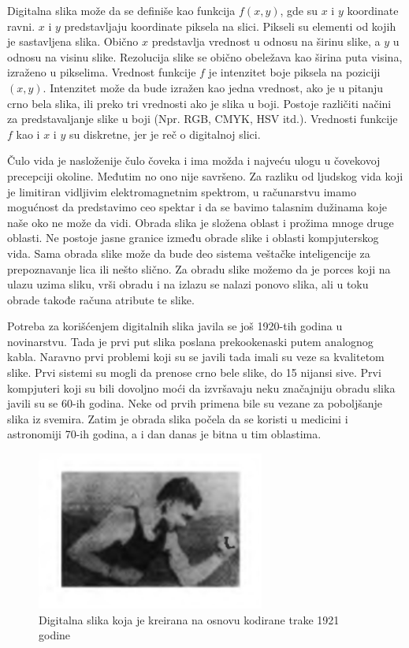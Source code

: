 \documentclass[a4paper,12pt,titlepage]{article}
\begin{document}
Digitalna slika može da se definiše kao funkcija $f(x, y)$, gde su $x$ i $y$ koordinate ravni. $x$ i $y$ predstavljaju koordinate piksela na slici. Pikseli su elementi od kojih je sastavljena slika. Obično $x$ predstavlja vrednost u odnosu na širinu slike, a $y$ u odnosu na visinu slike. Rezolucija slike se obično obeležava kao širina puta visina, izraženo u pikselima. Vrednost funkcije $f$ je intenzitet boje piksela na poziciji $(x, y)$. Intenzitet može da bude izražen kao jedna vrednost, ako je u pitanju crno bela slika, ili preko tri vrednosti ako je slika u boji. Postoje različiti načini za predstavaljanje slike u boji (Npr. RGB, CMYK, HSV itd.). Vrednosti funkcije $f$ kao i $x$ i $y$ su diskretne, jer je reč o digitalnoj slici. 

Čulo vida je nasloženije čulo čoveka i ima možda i najveću ulogu u čovekovoj precepciji okoline. Međutim no ono nije savršeno. Za razliku od ljudskog vida koji je limitiran vidljivim elektromagnetnim spektrom, u računarstvu imamo mogućnost da predstavimo ceo spektar i da se bavimo talasnim dužinama koje naše oko ne može da vidi. Obrada slika je složena oblast i prožima mnoge druge oblasti. Ne postoje jasne granice između obrade slike i oblasti kompjuterskog vida. Sama obrada slike može da bude deo sistema veštačke inteligencije za prepoznavanje lica ili nešto slično. Za obradu slike možemo da je porces koji na ulazu uzima sliku,   
vrši obradu i na izlazu se nalazi ponovo slika, ali u toku obrade takođe računa atribute te slike. 

Potreba za korišćenjem digitalnih slika javila se još 1920-tih godina u novinarstvu. Tada je prvi put slika poslana prekookenaski putem analognog kabla. Naravno prvi problemi koji su se javili tada imali su veze sa kvalitetom slike. Prvi sistemi su mogli da prenose crno bele slike, do 15 nijansi sive. Prvi kompjuteri koji su bili dovoljno moći da izvršavaju neku značajniju obradu slika javili su se 60-ih godina. Neke od prvih primena bile su vezane za poboljšanje slika iz svemira. Zatim je obrada slika počela da se koristi u medicini i astronomiji 70-ih godina, a i dan danas je bitna u tim oblastima.

\begin{figure}[ht!]
\centering
\includegraphics[width=75mm]{img/prvaPrenesenaSlika.png}
\caption{Digitalna slika koja je kreirana na osnovu kodirane trake 1921 godine}
\label{overflow}
\end{figure} 
\end{document}

